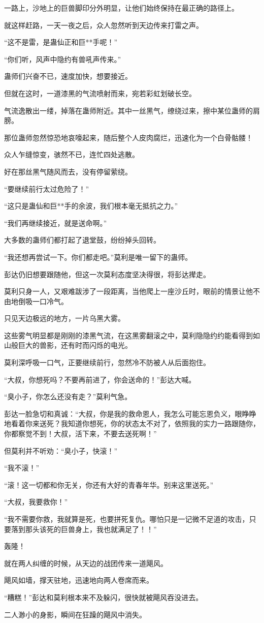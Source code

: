 \begin{this_body}
一路上，沙地上的巨兽脚印分外明显，让他们始终保持在最正确的路径上。

就这样赶路，一天一夜之后，众人忽然听到天边传来打雷之声。

“这不是雷，是蛊仙正和巨**手呢！”

“你们听，风声中隐约有兽吼声传来。”

蛊师们兴奋不已，速度加快，想要接近。

但就在这时，一道漆黑的气流喷射而来，宛若彩虹划破长空。

气流逸散出一缕，掉落在蛊师附近。其中一丝黑气，缭绕过来，擦中某位蛊师的肩膀。

那位蛊师忽然惊恐地哀嚎起来，随后整个人皮肉腐烂，迅速化为一个白骨骷髅！

众人乍缝惊变，骇然不已，连忙四处逃散。

好在那丝黑气随风而去，没有停留萦绕。

“要继续前行太过危险了！”

“这只是蛊仙和巨**手的余波，我们根本毫无抵抗之力。”

“我们再继续接近，就是送命啊。”

大多数的蛊师们都打起了退堂鼓，纷纷掉头回转。

“我还想再尝试一下。你们都走吧。”莫利是唯一留下的蛊师。

彭达仍旧想要跟随他，但这一次莫利态度坚决得很，将彭达撵走。

莫利只身一人，又艰难跋涉了一段距离，当他爬上一座沙丘时，眼前的情景让他不由地倒吸一口冷气。

只见天边极远的地方，一片乌黑大雾。

这些雾气明显都是刚刚的漆黑气流，在这黑雾翻滚之中，莫利隐隐约约能看得到如山般巨大的兽影，还有时而闪烁的电光。

莫利深呼吸一口气，正要继续前行，忽然冷不防被人从后面抱住。

“大叔，你想死吗？不要再前进了，你会送命的！”彭达大喊。

“臭小子，你怎么还没有走？”莫利气急。

彭达一脸急切和真诚：“大叔，你是我的救命恩人，我怎么可能忘恩负义，眼睁睁地看着你来送死？我知道你想死，你的状态太不对了，依照我的实力一路跟随你，你都察觉不到！大叔，活下来，不要去送死啊！”

但莫利并不听劝：“臭小子，快滚！”

“我不滚！”

“滚！这一切都和你无关，你还有大好的青春年华。别来这里送死。”

“大叔，我要救你！”

“我不需要你救，我就算是死，也要拼死复仇。哪怕只是一记微不足道的攻击，只要落到那头该死的巨兽身上，我也就满足了！！”

轰隆！

就在两人纠缠的时候，从天边的战团传来一道飓风。

飓风如墙，撑天驻地，迅速地向两人卷席而来。

“糟糕！”彭达和莫利根本来不及躲闪，很快就被飓风吞没进去。

二人渺小的身影，瞬间在狂躁的飓风中消失。

\end{this_body}

